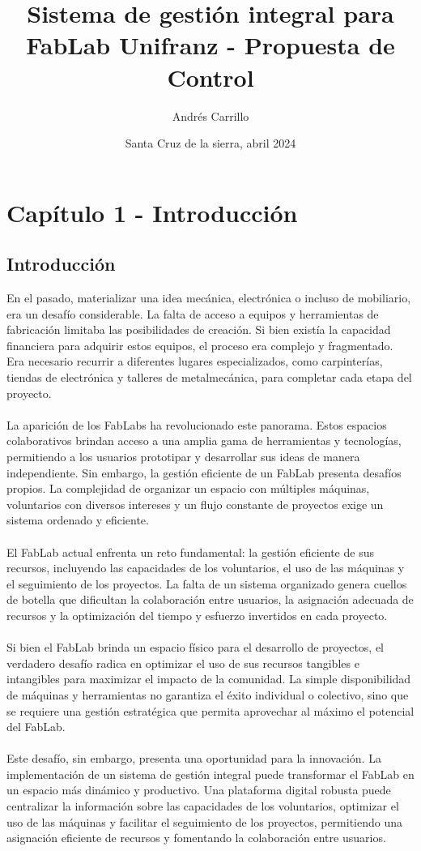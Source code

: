 \documentclass{article}
\title{Sistema de gestión integral para FabLab Unifranz - Propuesta de Control }
\author{Andrés Carrillo}
\date{Santa Cruz de la sierra, abril 2024}
\begin{document}
\maketitle
\tableofcontents
\section{Capítulo 1 - Introducción}
\subsection{Introducción}

En el pasado, materializar una idea mecánica, electrónica o incluso de mobiliario, era un desafío considerable. La falta de acceso a equipos y herramientas de fabricación limitaba las posibilidades de creación. Si bien existía la capacidad financiera para adquirir estos equipos, el proceso era complejo y fragmentado. Era necesario recurrir a diferentes lugares especializados, como carpinterías, tiendas de electrónica y talleres de metalmecánica, para completar cada etapa del proyecto.\\
\\
La aparición de los FabLabs ha revolucionado este panorama. Estos espacios colaborativos brindan acceso a una amplia gama de herramientas y tecnologías, permitiendo a los usuarios prototipar y desarrollar sus ideas de manera independiente. Sin embargo, la gestión eficiente de un FabLab presenta desafíos propios. La complejidad de organizar un espacio con múltiples máquinas, voluntarios con diversos intereses y un flujo constante de proyectos exige un sistema ordenado y eficiente.\\
\\
El FabLab actual enfrenta un reto fundamental: la gestión eficiente de sus recursos, incluyendo las capacidades de los voluntarios, el uso de las máquinas y el seguimiento de los proyectos. La falta de un sistema organizado genera cuellos de botella que dificultan la colaboración entre usuarios, la asignación adecuada de recursos y la optimización del tiempo y esfuerzo invertidos en cada proyecto.\\
\\
Si bien el FabLab brinda un espacio físico para el desarrollo de proyectos, el verdadero desafío radica en optimizar el uso de sus recursos tangibles e intangibles para maximizar el impacto de la comunidad. La simple disponibilidad de máquinas y herramientas no garantiza el éxito individual o colectivo, sino que se requiere una gestión estratégica que permita aprovechar al máximo el potencial del FabLab.\\
\\
Este desafío, sin embargo, presenta una oportunidad para la innovación. La implementación de un sistema de gestión integral puede transformar el FabLab en un espacio más dinámico y productivo. Una plataforma digital robusta puede centralizar la información sobre las capacidades de los voluntarios, optimizar el uso de las máquinas y facilitar el seguimiento de los proyectos, permitiendo una asignación eficiente de recursos y fomentando la colaboración entre usuarios.
\end{document}
